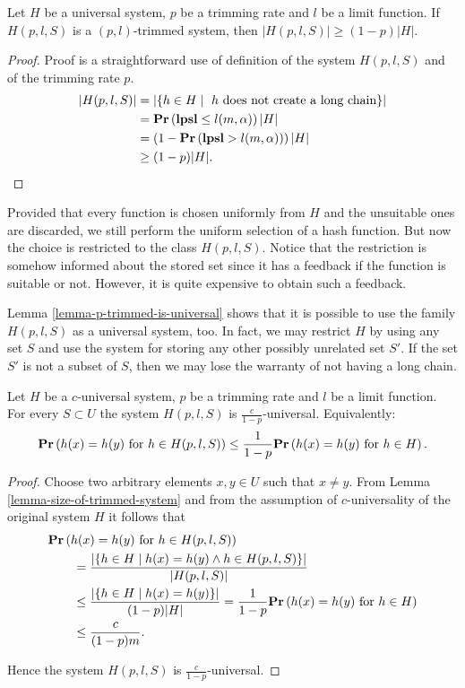\begin{lemma}
\label{lemma-size-of-trimmed-system}
Let $H$ be a universal system, $p$ be a trimming rate and $l$ be a limit function. If $H(p, l, S)$ is a $(p, l)$-trimmed system, then $|H(p, l, S)| \geq (1 - p)|H|$.
\end{lemma}
\begin{proof}
Proof is a straightforward use of definition of the system $H(p, l, S)$ and of the trimming rate $p$.
\[
\begin{split}
|H(p, l, S)| 
	& = |\lbrace h \in H \mid \text{ $h$ does not create a long chain} \rbrace| \\
	& =\mathbf{Pr}\left(\mathbf{lpsl} \leq l(m, \alpha)\right) |H| \\
	& = \left(1 - \mathbf{Pr}\left(\mathbf{lpsl} > l(m, \alpha)\right)\right) |H| \\
	& \geq (1 - p)|H| \text{.}
\end{split}
\]
\end{proof}

Provided that every function is chosen uniformly from $H$ and the unsuitable ones are discarded, we still perform the uniform selection of a hash function. But now the choice is restricted to the class $H(p, l, S)$. Notice that the restriction is somehow informed about the stored set since it has a feedback if the function is suitable or not. However, it is quite expensive to obtain such a feedback.

Lemma \ref{lemma-p-trimmed-is-universal} shows that it is possible to use the family $H(p, l, S)$ as a universal system, too. In fact, we may restrict $H$ by using any set $S$ and use the system for storing any other possibly unrelated set $S'$. If the set $S'$ is not a subset of $S$, then we may lose the warranty of not having a long chain.
\begin{lemma}
\label{lemma-p-trimmed-is-universal}
Let $H$ be a $c$-universal system, $p$ be a trimming rate and $l$ be a limit function. For every $S \subset U$ the system $H(p, l, S)$ is $\frac{c}{1 - p}$-universal. Equivalently:
\[
	\mathbf{Pr}\left(h(x) = h(y) \text{ for } h \in H(p, l, S)\right) \leq \frac{1}{1 - p} \mathbf{Pr}\left(h(x) = h(y) \text{ for } h \in H\right) \text{.}
\]
\begin{proof}
Choose two arbitrary elements $x, y \in U$ such that $x \neq y$. From Lemma \ref{lemma-size-of-trimmed-system} and from the assumption of $c$-universality of the original system $H$ it follows that 
\[
\begin{split}
& \mathbf{Pr}\left(h(x) = h(y) \text{ for } h \in H(p, l, S)\right)  \\
	& \qquad =  \frac{|\{ h \in H \mid h(x) = h(y) \wedge h \in H(p, l, S)\}|}{|H(p, l, S)|} \\
	& \qquad \leq \frac{|\{ h \in H \mid h(x) = h(y) \}|}{(1 - p)|H|} = \frac{1}{1 - p} \mathbf{Pr}\left(h(x) = h(y) \text{ for } h \in H\right) \\
	& \qquad \leq \frac{c}{(1 - p) m} \text{.}
\end{split}
\]

Hence the system $H(p, l, S)$ is $\frac{c}{1 - p}$-universal.
\end{proof}
\end{lemma}

